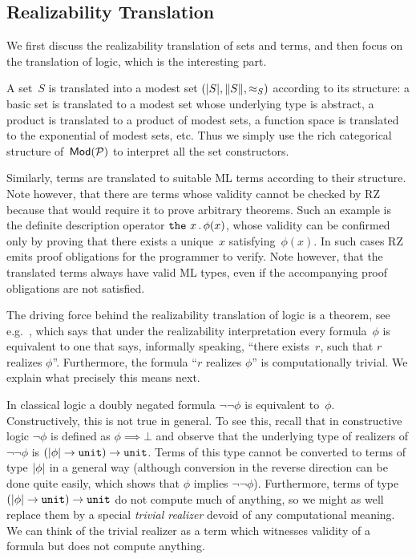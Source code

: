 \subsection{Realizability Translation}

We first discuss the realizability translation of sets and terms, and
then focus on the translation of logic, which is the interesting part.

A set~$S$ is translated into a modest set $(|S|, \|S\|,
{\approx_{S}})$ according to its structure: a basic set is translated to a
modest set whose underlying type is abstract, a product is translated
to a product of modest sets, a function space is translated to the
exponential of modest sets, etc. Thus we simply use the rich
categorical structure of~$\mathsf{Mod}(\mathcal{P})$ to interpret all the set
constructors.

Similarly, terms are translated to suitable ML terms according to
their structure. Note however, that there are terms whose validity
cannot be checked by RZ because that would require it to prove
arbitrary theorems. Such an example is the definite description
operator $\mbox{\texttt{the}}\ x \,.\, \phi(x)$, whose validity can be confirmed only
by proving that there exists a unique~$x$ satisfying~$\phi(x)$. In
such cases RZ emits proof obligations for the programmer to verify.
Note however, that the translated terms always have valid ML types,
even if the accompanying proof obligations are not satisfied.

The driving force behind the realizability translation of logic is a
theorem, see e.g.\ \cite[Thm.~4.4.10]{Troelstra:van-Dalen:88:1}, which
says that under the realizability interpretation every formula~$\phi$
is equivalent to one that says, informally speaking, ``there
exists~$r$, such that $r$ realizes $\phi$''. Furthermore, the formula
``$r$ realizes $\phi$'' is computationally trivial. We explain what
precisely this means next.

In classical logic a doubly negated formula $\lnot\lnot\phi$ is
equivalent to~$\phi$. Constructively, this is not true in general. To
see this, recall that in constructive logic $\lnot\phi$ is defined as
$\phi \implies \bot$ and observe that the underlying type of realizers
of $\lnot\lnot\phi$ is $(|\phi| \to \mathtt{unit}) \to
\mathtt{unit}$. Terms of this type cannot be converted to terms of
type $|\phi|$ in a general way (although conversion in the reverse
direction can be done quite easily, which shows that $\phi$ implies
$\lnot\lnot\phi$). Furthermore, terms of type $(|\phi| \to
\mathtt{unit}) \to \mathtt{unit}$ do not compute much of anything, so
we might as well replace them by a special \emph{trivial realizer}
devoid of any computational meaning. We can think of the trivial
realizer as a term which witnesses validity of a formula but does not
compute anything.

